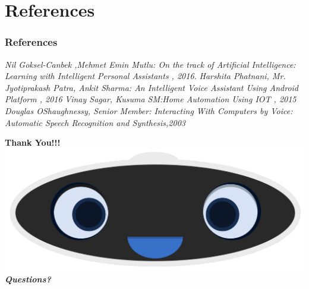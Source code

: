 \documentclass[xcolor=dvipsnames]{beamer}
\begin{document}
\section{References}
\begin{frame}
\frametitle{References}
\begin{thebibliography}{5}
 \emph{ Nil Goksel-Canbek ,Mehmet Emin Mutlu: On the track of Artiﬁcial Intelligence: Learning with Intelligent Personal Assistants , 2016.}{\vspace{.6cm}}
 \emph{Harshita Phatnani, Mr. Jyotiprakash Patra, Ankit Sharma: An Intelligent Voice Assistant Using Android Platform , 2016 }{\vspace{.6cm}}
 \emph{Vinay Sagar, Kusuma SM:Home Automation Using IOT , 2015 }{\vspace{.6cm}}
 \emph{ Douglas OShaughnessy, Senior Member: Interacting With Computers by Voice: Automatic Speech Recognition and Synthesis,2003}{\vspace{1cm}}
\end{thebibliography}
\end{frame}
\begin{frame}
\begin{center}
\textbf{\huge{Thank You!!!}}\\
\vspace{0.5cm}
\includegraphics[scale=3]{images/thanks.png}
\\\vspace{0.5cm}
\textbf{\textsl{\huge{Questions?}}}\\
\end{center}
\end{frame}
\end{document}
